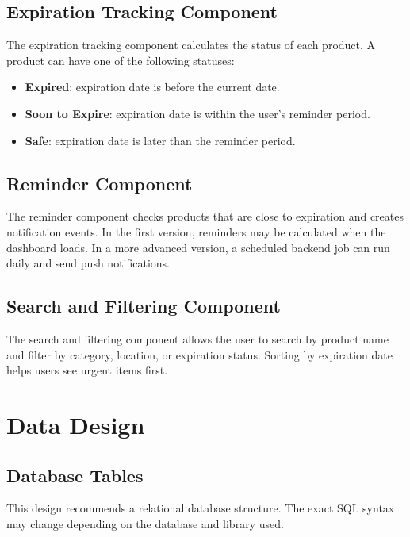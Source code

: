 \documentclass[12pt]{article}
\begin{document}
\subsection{Expiration Tracking Component}
The expiration tracking component calculates the status of each product. A product can have one of the following statuses:
\begin{itemize}
    \item \textbf{Expired}: expiration date is before the current date.
    \item \textbf{Soon to Expire}: expiration date is within the user's reminder period.
    \item \textbf{Safe}: expiration date is later than the reminder period.
\end{itemize}

\subsection{Reminder Component}
The reminder component checks products that are close to expiration and creates notification events. In the first version, reminders may be calculated when the dashboard loads. In a more advanced version, a scheduled backend job can run daily and send push notifications.

\subsection{Search and Filtering Component}
The search and filtering component allows the user to search by product name and filter by category, location, or expiration status. Sorting by expiration date helps users see urgent items first.

\section{Data Design}

\subsection{Database Tables}
This design recommends a relational database structure. The exact SQL syntax may change depending on the database and library used.
\end{document}
